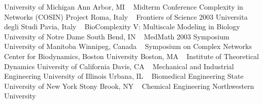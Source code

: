 \newline
    University of Michigan
    \newline
Ann Arbor, MI
\newline
~
\Gap
{}
Midterm Conference
\newline
    Complexity in Networks (COSIN) Project
    \newline
Roma, Italy
\newline
~
\Gap
{}
Frontiers of Science 2003
\newline
    Universita degli Studi
    \newline
Pavia, Italy
\newline
~
\Gap
{}
BioComplexity V: Multiscale Modeling in Biology
\newline
    University of Notre  Dame
    \newline
South Bend, IN
\newline
~
\Gap
{}
MedMath 2003 Symposium
\newline
    University of Manitoba
    \newline
Winnipeg, Canada
\newline
~
\Gap
{}
Symposium on Complex Networks
\newline
    Center for Biodynamics, Boston University
    \newline
Boston, MA
\newline
~
\Gap
{}
Institute of Theoretical Dynamics
\newline
    University of California
    \newline
Davis, CA
\newline
~
\Gap
{}
Mechanical and Industrial Engineering
\newline
    University of Illinois
    \newline
Urbana, IL
\newline
~
\Gap
{}
Biomedical Engineering
\newline
    State University of New York
    \newline
Stony Brook, NY
\newline
~
\Gap
{}
Chemical Engineering
\newline
    Northwestern University
    \newline
